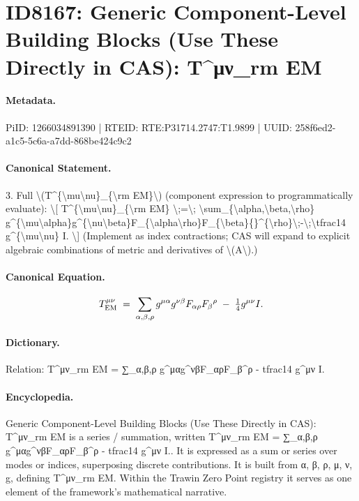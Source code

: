 \section*{ID8167: Generic Component-Level Building Blocks (Use These Directly in CAS): T\textasciicircum{}μν\_rm EM}
\paragraph{Metadata.}
PiID: 1266034891390 | RTEID: RTE:P31714.2747:T1.9899 | UUID: 258f6ed2-a1c5-5c6a-a7dd-868be424c9c2

\paragraph{Canonical Statement.}
3. Full \textbackslash{}(T\textasciicircum{}\{\textbackslash{}mu\textbackslash{}nu\}\_\{\textbackslash{}rm EM\}\textbackslash{}) (component expression to programmatically evaluate): \textbackslash{}[ T\textasciicircum{}\{\textbackslash{}mu\textbackslash{}nu\}\_\{\textbackslash{}rm EM\} \textbackslash{};=\textbackslash{}; \textbackslash{}sum\_\{\textbackslash{}alpha,\textbackslash{}beta,\textbackslash{}rho\} g\textasciicircum{}\{\textbackslash{}mu\textbackslash{}alpha\}g\textasciicircum{}\{\textbackslash{}nu\textbackslash{}beta\}F\_\{\textbackslash{}alpha\textbackslash{}rho\}F\_\{\textbackslash{}beta\}\{\}\textasciicircum{}\{\textbackslash{}rho\}\textbackslash{};-\textbackslash{};\textbackslash{}tfrac14 g\textasciicircum{}\{\textbackslash{}mu\textbackslash{}nu\} I. \textbackslash{}] (Implement as index contractions; CAS will expand to explicit algebraic combinations of metric and derivatives of \textbackslash{}(A\textbackslash{}).)

\paragraph{Canonical Equation.}
\[
T^{\mu\nu}_{\rm EM} \;=\; \sum_{\alpha,\beta,\rho} g^{\mu\alpha}g^{\nu\beta}F_{\alpha\rho}F_{\beta}{}^{\rho}\;-\;\tfrac14 g^{\mu\nu} I.
\]

\paragraph{Dictionary.}
Relation: T\textasciicircum{}μν\_rm EM = ∑\_α,β,ρ g\textasciicircum{}μαg\textasciicircum{}νβF\_αρF\_β\textasciicircum{}ρ - tfrac14 g\textasciicircum{}μν I.

\paragraph{Encyclopedia.}
Generic Component-Level Building Blocks (Use These Directly in CAS): T\textasciicircum{}μν\_rm EM is a series / summation, written T\textasciicircum{}μν\_rm EM = ∑\_α,β,ρ g\textasciicircum{}μαg\textasciicircum{}νβF\_αρF\_β\textasciicircum{}ρ - tfrac14 g\textasciicircum{}μν I.. It is expressed as a sum or series over modes or indices, superposing discrete contributions. It is built from α, β, ρ, μ, ν, g, defining T\textasciicircum{}μν\_rm EM. Within the Trawin Zero Point registry it serves as one element of the framework's mathematical narrative.
